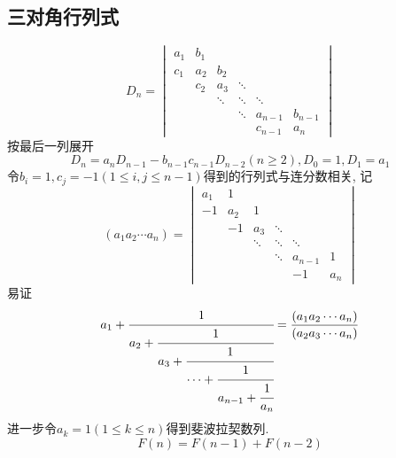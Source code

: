 \subsection{三对角行列式}
\begin{brown}
\begin{example}
\[
D_n=\begin{vmatrix}
    a_1 & b_1 & & & & \\
    c_1 & a_2 & b_2 &&&\\
    &c_2&a_3&\ddots&&\\
    &&\ddots&\ddots&\ddots&\\
    &&&\ddots&a_{n-1}&b_{n-1}\\
    &&&&c_{n-1}&a_n
\end{vmatrix}
\]
按最后一列展开
\[
D_n=a_nD_{n-1}-b_{n-1}c_{n-1}
D_{n-2}\left(n\geqslant 2\right)
,D_0=1,D_1=a_1
\]
令$b_i=1,c_j=-1\left(
  1\leqslant i,j\leqslant n-1
\right)$得到的行列式与连分数相关,
记
\[
\left(a_1a_2\cdots a_n\right)=
\begin{vmatrix}
    a_1 & 1 & & & & \\
    -1 & a_2 & 1 &&&\\
    &-1&a_3&\ddots&&\\
    &&\ddots&\ddots&\ddots&\\
    &&&\ddots&a_{n-1}&1\\
    &&&&-1&a_n
\end{vmatrix}
\]
易证
\[
a_1+\cfrac{1}{a_2+\cfrac{1}{a_3+\cfrac{1}{\cdots+\cfrac{1}{a_{n-1}+\cfrac{1}{a_n}}}}}
=
\frac{\left(a_1a_2
\cdots a_n\right)}{\left(
    a_2a_3\cdots a_n\right)}
\]
进一步令$a_k=1\left(
    1\leqslant k\leqslant n
\right)$得到斐波拉契数列.
\[
F\left(n\right) = F\left(n-1\right)+F\left(n-2\right)
\]\end{example}
\end{brown}
